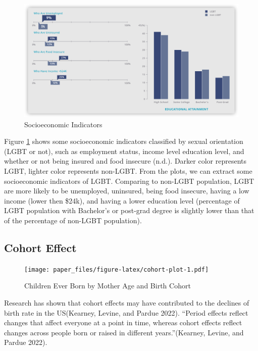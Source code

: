 \documentclass[
]{article}
\begin{document}
\begin{figure}

{\centering \includegraphics[width=.80\linewidth]{./images/LGBT-socioeconomic-indicators} 

}

\caption{Socioeconomic Indicators}\label{fig:fig-LGBT-socioeconomic-indicators}
\end{figure}

Figure \ref{fig:fig-LGBT-socioeconomic-indicators} shows some socioeconomic indicators classified by sexual orientation (LGBT or not), such as employment status, income level education level, and whether or not being insured and food insecure (n.d.). Darker color represents LGBT, lighter color represents non-LGBT.
From the plots, we can extract some socioeconomic indicators of LGBT. Comparing to non-LGBT population, LGBT are more likely to be unemployed, uninsured, being food insecure, having a low income (lower then \$24k), and having a lower education level (percentage of LGBT population with Bachelor's or post-grad degree is slightly lower than that of the percentage of non-LGBT population).

\hypertarget{cohort-effect}{%
\subsection{Cohort Effect}\label{cohort-effect}}

\begin{figure}
\centering
\texttt{[image: paper\_files/figure-latex/cohort-plot-1.pdf]}
\caption{\label{fig:cohort-plot}Children Ever Born by Mother Age and Birth Cohort}
\end{figure}

Research has shown that cohort effects may have contributed to the declines of birth rate in the US(Kearney, Levine, and Pardue 2022).
``Period effects reflect changes that affect everyone at a point in time, whereas cohort effects reflect changes across people born or raised in different years.''(Kearney, Levine, and Pardue 2022).
\end{document}
